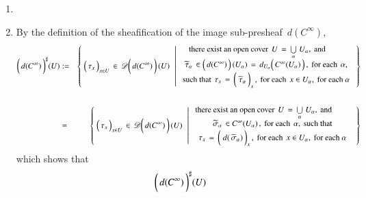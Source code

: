 \proof
\vskip 0.3cm
\begin{enumerate}
\item
\item
	By the definition of the sheafification of the image sub-presheaf \,$d(C^{\infty})$,\,
	\begin{eqnarray*}
	\left(\,\overset{{\color{white}.}}{d(C^{\infty})}\,\right)^{\sharp}\!(U)
	& := &
		\left\{\;
			\left(\,\overset{{\color{white}.}}{\tau_{x}}\,\right)_{x \in U} \,\in\, \mathscr{D}\!\left(\,\overset{{\color{white}.}}{d(C^{\infty})}\,\right)(U)
			\;\,\left\vert\;
				\begin{array}{c}
				\textnormal{there exist an open cover \,$U \,=\, \underset{\alpha}{\bigcup}\;U_{\alpha}$,\, and{\color{white}	2222.}}
				\\
				\textnormal{$\widetilde{\tau}_{\alpha} \,\in \left(\,\overset{{\color{white}.}}{d(C^{\infty})}\,\right)(U_{\alpha}) \,=\, d_{U_{\alpha}}\!\left(\,\overset{{\color{white}.}}{C^{\infty}(U_{\alpha})}\,\right)$\,, \,for each \,$\alpha$,}
				\\
				\textnormal{such that \,$\overset{{\color{white}\textnormal{\normalsize$1$}}}{\tau_{x}} \,=\, \left(\;\overset{{\color{white}.}}{\widetilde{\tau}_{\alpha}}\,\right)_{x}$\,,\, for each \,$x \in U_{\alpha}$,\, for each $\alpha$}
				\end{array}
				\right.
			\,\right\}
	\\ & {\color{white}\textnormal{\large$1$}} &
	\\
	& = &
		\left\{\;
			\left(\,\overset{{\color{white}.}}{\tau_{x}}\,\right)_{x \in U} \,\in\, \mathscr{D}\!\left(\,\overset{{\color{white}.}}{d(C^{\infty})}\,\right)(U)
			\;\,\left\vert\;
				\begin{array}{c}
				\textnormal{there exist an open cover \,$U \,=\, \underset{\alpha}{\bigcup}\;U_{\alpha}$,\, and{\color{white}	2222.}}
				\\
				\textnormal{$\widetilde{\sigma}_{\alpha} \,\in C^{\infty}(U_{\alpha})$\,, \,for each \,$\alpha$,\, such that}
				\\
				\textnormal{$\overset{{\color{white}\textnormal{\normalsize$1$}}}{\tau_{x}} \,=\, \left(\;\overset{{\color{white}.}}{d(\,\widetilde{\sigma}_{\alpha})}\,\right)_{x}$\,,\, for each \,$x \in U_{\alpha}$,\, for each $\alpha$}
				\end{array}
				\right.
			\,\right\}
	\end{eqnarray*}
	which shows that
	\begin{equation*}
	\left(\,\overset{{\color{white}.}}{d(C^{\infty})}\,\right)^{\sharp}\!(U)

\end{equation*}
\end{enumerate}
